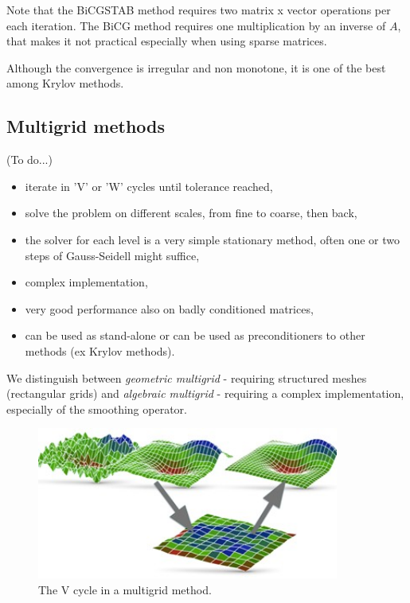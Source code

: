 \documentclass{digitaldynamics}
\begin{document}
Note that the BiCGSTAB method requires two matrix x vector operations per each iteration. The BiCG method requires one multiplication by an inverse of $A$, that makes it not practical especially when using sparse matrices. 

Although the convergence is irregular and non monotone, it is one of the best among Krylov methods. 




\subsection{Multigrid methods}

(To do...)

\begin{itemize}
	\item iterate in 'V' or 'W' cycles until tolerance reached,
  \item solve the problem on different scales, from fine to coarse, then back,
	\item the solver for each level is a very simple stationary method, often one or two steps of Gauss-Seidell might suffice,
	\item complex implementation,
	\item very good performance also on badly conditioned matrices,
  \item can be used as stand-alone or can be used as preconditioners to other methods (ex Krylov methods).
\end{itemize}

We distinguish between \textit{geometric multigrid}	- requiring structured meshes (rectangular grids)
and \textit{algebraic multigrid} - requiring a complex implementation, especially of the smoothing operator.

\begin{figure}
		\centering
			\includegraphics[height=5cm]{pics/es_multigrid.jpg}
		\caption{The V cycle in a multigrid method.}
		\label{fig:es_multigrid}
	\end{figure}
\end{document}
